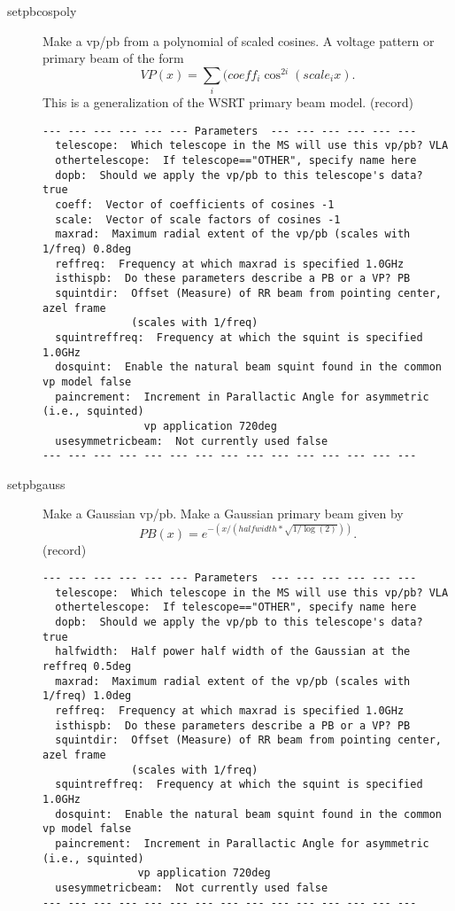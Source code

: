 \documentclass[12pt]{article}
\begin{document}
\begin{description}
  \item[setpbcospoly]
   Make a vp/pb from a polynomial of scaled cosines.
   A voltage pattern or primary beam of the form
   \begin{equation}
     VP(x) = \sum_{i} ( coeff_{i} \cos^{2i}( scale_{i} x).
   \end{equation}
   This is a generalization of the WSRT primary beam model. (record)
{\small
\begin{verbatim}
--- --- --- --- --- --- Parameters  --- --- --- --- --- ---
  telescope:  Which telescope in the MS will use this vp/pb? VLA 
  othertelescope:  If telescope=="OTHER", specify name here 
  dopb:  Should we apply the vp/pb to this telescope's data? true 
  coeff:  Vector of coefficients of cosines -1
  scale:  Vector of scale factors of cosines -1 
  maxrad:  Maximum radial extent of the vp/pb (scales with 1/freq) 0.8deg 
  reffreq:  Frequency at which maxrad is specified 1.0GHz 
  isthispb:  Do these parameters describe a PB or a VP? PB 
  squintdir:  Offset (Measure) of RR beam from pointing center, azel frame 
              (scales with 1/freq) 
  squintreffreq:  Frequency at which the squint is specified 1.0GHz 
  dosquint:  Enable the natural beam squint found in the common vp model false 
  paincrement:  Increment in Parallactic Angle for asymmetric (i.e., squinted)
                vp application 720deg 
  usesymmetricbeam:  Not currently used false 
--- --- --- --- --- --- --- --- --- --- --- --- --- --- ---
\end{verbatim} 
} 

 
  \item[setpbgauss]
   Make a Gaussian vp/pb.
   Make a Gaussian primary beam given by
   \begin{equation}
     PB(x) =  e^{- (x/(halfwidth*\sqrt{1/\log(2)})) }.
   \end{equation}
   (record)
{\small
\begin{verbatim}
--- --- --- --- --- --- Parameters  --- --- --- --- --- ---
  telescope:  Which telescope in the MS will use this vp/pb? VLA 
  othertelescope:  If telescope=="OTHER", specify name here 
  dopb:  Should we apply the vp/pb to this telescope's data? true 
  halfwidth:  Half power half width of the Gaussian at the reffreq 0.5deg 
  maxrad:  Maximum radial extent of the vp/pb (scales with 1/freq) 1.0deg 
  reffreq:  Frequency at which maxrad is specified 1.0GHz 
  isthispb:  Do these parameters describe a PB or a VP? PB 
  squintdir:  Offset (Measure) of RR beam from pointing center, azel frame 
              (scales with 1/freq) 
  squintreffreq:  Frequency at which the squint is specified 1.0GHz 
  dosquint:  Enable the natural beam squint found in the common vp model false 
  paincrement:  Increment in Parallactic Angle for asymmetric (i.e., squinted) 
               vp application 720deg 
  usesymmetricbeam:  Not currently used false 
--- --- --- --- --- --- --- --- --- --- --- --- --- --- ---
\end{verbatim} 
}
 

\end{description}
\end{document}

